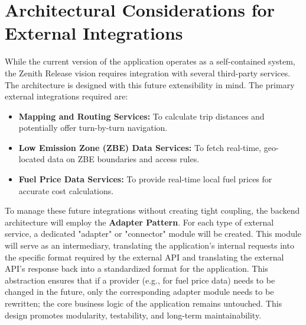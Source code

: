 \section{Architectural Considerations for External Integrations}

While the current version of the application operates as a self-contained system, the Zenith Release vision requires integration with several third-party services. The architecture is designed with this future extensibility in mind. The primary external integrations required are:

\begin{itemize}
    \item \textbf{Mapping and Routing Services:} To calculate trip distances and potentially offer turn-by-turn navigation.
    \item \textbf{Low Emission Zone (ZBE) Data Services:} To fetch real-time, geo-located data on ZBE boundaries and access rules.
    \item \textbf{Fuel Price Data Services:} To provide real-time local fuel prices for accurate cost calculations.
\end{itemize}

\textgap

To manage these future integrations without creating tight coupling, the backend architecture will employ the \textbf{Adapter Pattern}. For each type of external service, a dedicated "adapter" or "connector" module will be created. This module will serve as an intermediary, translating the application's internal requests into the specific format required by the external API and translating the external API's response back into a standardized format for the application. This abstraction ensures that if a provider (e.g., for fuel price data) needs to be changed in the future, only the corresponding adapter module needs to be rewritten; the core business logic of the application remains untouched. This design promotes modularity, testability, and long-term maintainability.
